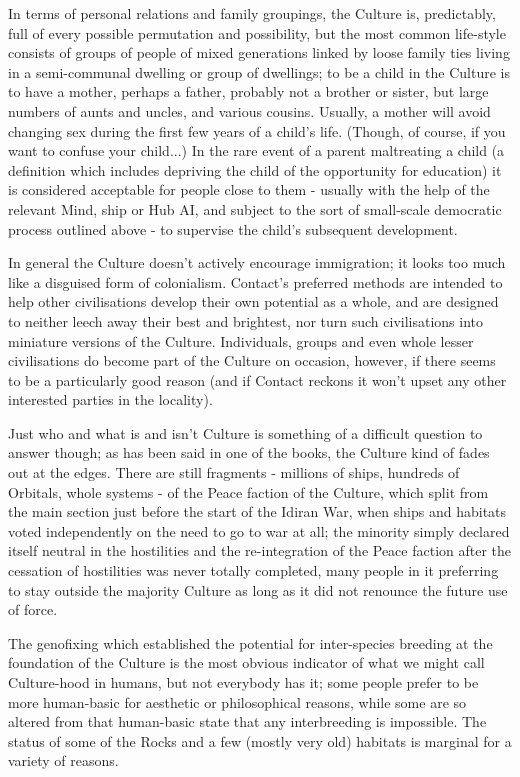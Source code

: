 In terms of personal relations and family groupings, the Culture is, predictably, full of every possible permutation and possibility, but the most common life-style consists of groups of people of mixed generations linked by loose family ties living in a semi-communal dwelling or group of dwellings; to be a child in the Culture is to have a mother, perhaps a father, probably not a brother or sister, but large numbers of aunts and uncles, and various cousins. Usually, a mother will avoid changing sex during the first few years of a child's life. (Though, of course, if you want to confuse your child...) In the rare event of a parent maltreating a child (a definition which includes depriving the child of the opportunity for education) it is considered acceptable for people close to them - usually with the help of the relevant Mind, ship or Hub AI, and subject to the sort of small-scale democratic process outlined above - to supervise the child's subsequent development.

In general the Culture doesn't actively encourage immigration; it looks too much like a disguised form of colonialism. Contact's preferred methods are intended to help other civilisations develop their own potential as a whole, and are designed to neither leech away their best and brightest, nor turn such civilisations into miniature versions of the Culture. Individuals, groups and even whole lesser civilisations do become part of the Culture on occasion, however, if there seems to be a particularly good reason (and if Contact reckons it won't upset any other interested parties in the locality).

Just who and what is and isn't Culture is something of a difficult question to answer though; as has been said in one of the books, the Culture kind of fades out at the edges. There are still fragments - millions of ships, hundreds of Orbitals, whole systems - of the Peace faction of the Culture, which split from the main section just before the start of the Idiran War, when ships and habitats voted independently on the need to go to war at all; the minority simply declared itself neutral in the hostilities and the re-integration of the Peace faction after the cessation of hostilities was never totally completed, many people in it preferring to stay outside the majority Culture as long as it did not renounce the future use of force.

The genofixing which established the potential for inter-species breeding at the foundation of the Culture is the most obvious indicator of what we might call Culture-hood in humans, but not everybody has it; some people prefer to be more human-basic for aesthetic or philosophical reasons, while some are so altered from that human-basic state that any interbreeding is impossible. The status of some of the Rocks and a few (mostly very old) habitats is marginal for a variety of reasons.

